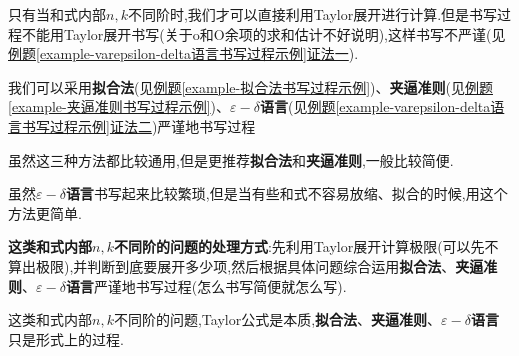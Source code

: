 \documentclass[../../main.tex]{subfiles}
\begin{document}
只有当和式内部$n,k$不同阶时,我们才可以直接利用Taylor展开进行计算.但是书写过程不能用Taylor展开书写(关于o和O余项的求和估计不好说明),这样书写不严谨(见\hyperref[example-varepsilon-delta语言书写过程示例]{例题\ref{example-varepsilon-delta语言书写过程示例}证法一}).

我们可以采用\textbf{拟合法}(见\hyperref[example-拟合法书写过程示例]{例题\ref{example-拟合法书写过程示例}})、\textbf{夹逼准则}(见\hyperref[example-夹逼准则书写过程示例]{例题\ref{example-夹逼准则书写过程示例}})、\textbf{$\varepsilon-\delta$语言}(见\hyperref[example-varepsilon-delta语言书写过程示例]{例题\ref{example-varepsilon-delta语言书写过程示例}证法二})严谨地书写过程

\begin{note}
虽然这三种方法都比较通用,但是更推荐\textbf{拟合法}和\textbf{夹逼准则},一般比较简便.

虽然\textbf{$\varepsilon-\delta$语言}书写起来比较繁琐,但是当有些和式不容易放缩、拟合的时候,用这个方法更简单.
\end{note}

\textbf{这类和式内部$n,k$不同阶的问题的处理方式}:先利用Taylor展开计算极限(可以先不算出极限),并判断到底要展开多少项,然后根据具体问题综合运用\textbf{拟合法}、\textbf{夹逼准则}、\textbf{$\varepsilon-\delta$语言}严谨地书写过程(怎么书写简便就怎么写).

\begin{remark}
这类和式内部$n,k$不同阶的问题,Taylor公式是本质,\textbf{拟合法}、\textbf{夹逼准则}、\textbf{$\varepsilon-\delta$语言}只是形式上的过程.
\end{remark}
\end{document}
